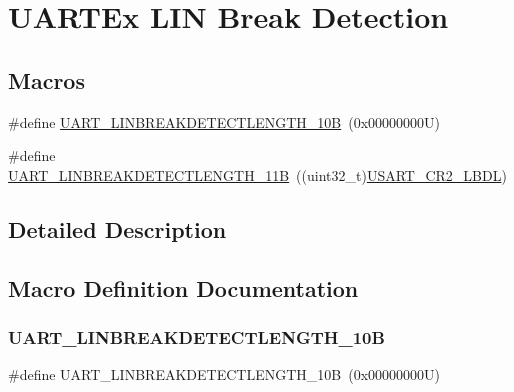 \hypertarget{group___u_a_r_t_ex___l_i_n___break___detection}{}\section{U\+A\+R\+T\+Ex L\+IN Break Detection}
\label{group___u_a_r_t_ex___l_i_n___break___detection}
\subsection*{Macros}
\begin{DoxyCompactItemize}
\item 
\#define \hyperlink{group___u_a_r_t_ex___l_i_n___break___detection_ga027616b7a36b36e0e51ffee947533624}{U\+A\+R\+T\+\_\+\+L\+I\+N\+B\+R\+E\+A\+K\+D\+E\+T\+E\+C\+T\+L\+E\+N\+G\+T\+H\+\_\+10B}~(0x00000000\+U)
\item 
\#define \hyperlink{group___u_a_r_t_ex___l_i_n___break___detection_ga2f66fcd37de7a3ca9e1101305f2e23e6}{U\+A\+R\+T\+\_\+\+L\+I\+N\+B\+R\+E\+A\+K\+D\+E\+T\+E\+C\+T\+L\+E\+N\+G\+T\+H\+\_\+11B}~((uint32\+\_\+t)\hyperlink{group___peripheral___registers___bits___definition_ga7f9bc41700717fd93548e0e95b6072ed}{U\+S\+A\+R\+T\+\_\+\+C\+R2\+\_\+\+L\+B\+DL})
\end{DoxyCompactItemize}


\subsection{Detailed Description}


\subsection{Macro Definition Documentation}
\mbox{\label{group___u_a_r_t_ex___l_i_n___break___detection_ga027616b7a36b36e0e51ffee947533624}} 
\subsubsection{\texorpdfstring{U\+A\+R\+T\+\_\+\+L\+I\+N\+B\+R\+E\+A\+K\+D\+E\+T\+E\+C\+T\+L\+E\+N\+G\+T\+H\+\_\+10B}{UART\_LINBREAKDETECTLENGTH\_10B}}
{\footnotesize\ttfamily \#define U\+A\+R\+T\+\_\+\+L\+I\+N\+B\+R\+E\+A\+K\+D\+E\+T\+E\+C\+T\+L\+E\+N\+G\+T\+H\+\_\+10B~(0x00000000\+U)}

